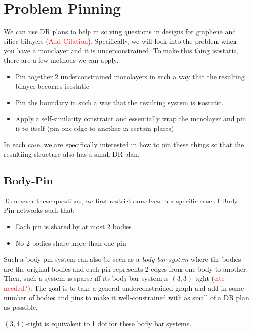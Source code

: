 \section{Problem Pinning}

We can use DR plans to help in solving questions in designs for graphene and silica bilayers (\textcolor{red}{Add Citation}). Specifically, we will look into the problem when you have a monolayer and it is underconstrained. To make this thing isostatic, there are a few methods we can apply. 

\begin{itemize}
    \item Pin together 2 underconstrained monolayers in such a way that the resulting bilayer becomes isostatic.
    \item Pin the boundary in such a way that the resulting system is isostatic.
    \item Apply a self-similarity constraint and essentially wrap the monolayer and pin it to itself (pin one edge to another in certain places)
\end{itemize}

In each case, we are specifically interested in how to pin these things so that the resultiing structure also has a small DR plan.

\subsection{Body-Pin}

To answer these questions, we first restrict ourselves to a specific case of Body-Pin networks such that:

\begin{itemize}
    \item Each pin is shared by at most 2 bodies
    \item No 2 bodies share more than one pin 
\end{itemize}

Such a body-pin system can also be seen as a {\em body-bar system} where the bodies are the original bodies and each pin represents 2 edges from one body to another. Then, such a system is sparse iff its body-bar system is $(3,3)$-tight (\textcolor{red}{cite needed?}). The goal is to take a general underconstrained graph and add in some number of bodies and pins to make it well-constrained with as small of a DR plan as possible.

\begin{theorem}
\label{thm:34tight}
    $(3,4)$-tight is equivalent to 1 dof for these body bar systems. 
\end{theorem}  

